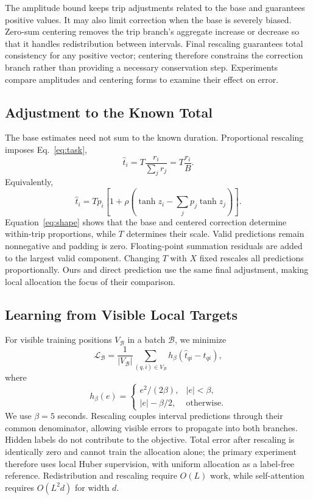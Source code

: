 The amplitude bound keeps trip adjustments related to the base and guarantees positive values. It may also limit correction when the base is severely biased. Zero-sum centering removes the trip branch's aggregate increase or decrease so that it handles redistribution between intervals. Final rescaling guarantees total consistency for any positive vector; centering therefore constrains the correction branch rather than providing a necessary conservation step. Experiments compare amplitudes and centering forms to examine their effect on error.

\subsection{Adjustment to the Known Total}
The base estimates need not sum to the known duration. Proportional rescaling imposes Eq.~\eqref{eq:task},
\begin{equation}
 \hat t_i=T\frac{r_i}{\sum_jr_j}=T\frac{r_i}{B}.
\label{eq:rescaling}
\end{equation}
Equivalently,
\begin{equation}
 \hat t_i=T p_i\left[1+\rho\left(\tanh z_i-\sum_jp_j\tanh z_j\right)\right].
\label{eq:shape}
\end{equation}
Equation~\eqref{eq:shape} shows that the base and centered correction determine within-trip proportions, while $T$ determines their scale. Valid predictions remain nonnegative and padding is zero. Floating-point summation residuals are added to the largest valid component. Changing $T$ with $X$ fixed rescales all predictions proportionally. Ours and direct prediction use the same final adjustment, making local allocation the focus of their comparison.

\subsection{Learning from Visible Local Targets}
For visible training positions $V_{\mathcal B}$ in a batch $\mathcal B$, we minimize
\begin{equation}
 \mathcal L_{\mathcal B}=\frac{1}{|V_{\mathcal B}|}
 \sum_{(q,i)\in V_{\mathcal B}}h_\beta(\hat t_{qi}-t_{qi}),
\label{eq:loss}
\end{equation}
where
\begin{equation}
 h_\beta(e)=
 \begin{cases}e^2/(2\beta),&|e|<\beta,\\ |e|-\beta/2,&\text{otherwise}.
 \end{cases}
\end{equation}
We use $\beta=5$ seconds. Rescaling couples interval predictions through their common denominator, allowing visible errors to propagate into both branches. Hidden labels do not contribute to the objective. Total error after rescaling is identically zero and cannot train the allocation alone; the primary experiment therefore uses local Huber supervision, with uniform allocation as a label-free reference. Redistribution and rescaling require $O(L)$ work, while self-attention requires $O(L^2d)$ for width $d$.

